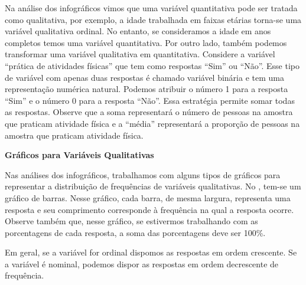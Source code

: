 \begin{observation}

Na análise dos infográficos vimos que uma variável quantitativa pode ser tratada como qualitativa, por exemplo, a idade trabalhada em faixas etárias torna-se uma variável qualitativa ordinal. No entanto, se consideramos a idade em anos completos temos uma variável quantitativa. Por outro lado, também podemos transformar uma variável qualitativa em quantitativa. Considere a variável ``prática de atividades físicas'' que tem como respostas ``Sim'' ou ``Não''. Esse tipo de variável com apenas duas respostas é chamado variável binária e tem uma representação numérica natural. Podemos atribuir o número 1 para a resposta ``Sim'' e o número 0 para a resposta ``Não''. Essa estratégia permite somar todas as respostas. Observe que a soma representará o número de pessoas na amostra que praticam atividade física e a ``média'' representará a proporção de pessoas na amostra que praticam atividade física.
\end{observation}

\textbf{Gráficos para Variáveis Qualitativas}

Nas análises dos infográficos, trabalhamos com alguns tipos de gráficos para representar a distribuição de frequências de variáveis qualitativas. No {\hyperref[\detokenize{PE103-0:fig-infografico-pnad-3}]{}}, tem-se um gráfico de barras. Nesse gráfico, cada barra, de mesma largura, representa uma resposta e seu comprimento corresponde à frequência na qual a resposta ocorre. Observe também que, nesse gráfico, se estivermos trabalhando com as porcentagens de cada resposta, a soma das porcentagens deve ser 100\%.

Em geral, se a variável for ordinal dispomos as respostas em ordem crescente. Se a variável é nominal, podemos dispor as respostas em ordem decrescente de frequência.

